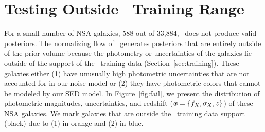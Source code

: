 \section{Testing Outside \sedflow~Training Range} \label{sec:fail}
For a small number of NSA galaxies, 588 out of 33,884, \sedflow~does not
produce valid posteriors. 
The normalizing flow of \sedflow~generates posteriors that are entirely outside
of the prior volume because the photometry or uncertainties of the galaxies lie
outside of the support of the \sedflow~training data
(Section~\ref{sec:training}). 
These galaxies either  
(1) have unusually high photometric uncertainties that are not accounted
for in our noise model or 
(2) they have photometric colors that cannot be modeled by our SED model. 
In Figure~\ref{fig:fail}, we present the distribution of photometric
magnitudes, uncertainties, and redshift ($\textbf{\textit{x}} = \{f_X, \sigma_X, z\}$) of
these NSA galaxies. 
We mark galaxies that are outside the \sedflow~training data support (black)
due to (1) in orange and (2) in blue. 

